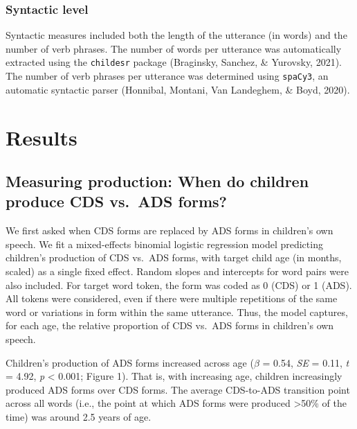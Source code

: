 \documentclass[10pt, letterpaper]{article}
\begin{document}
\hypertarget{syntactic-level}{%
\subsubsection{Syntactic level}\label{syntactic-level}}

Syntactic measures included both the length of the utterance (in words)
and the number of verb phrases. The number of words per utterance was
automatically extracted using the \texttt{childesr} package (Braginsky,
Sanchez, \& Yurovsky, 2021). The number of verb phrases per utterance
was determined using \texttt{spaCy3}, an automatic syntactic parser
(Honnibal, Montani, Van Landeghem, \& Boyd, 2020).

\hypertarget{results}{%
\section{Results}\label{results}}

\hypertarget{measuring-production-when-do-children-produce-cds-vs.-ads-forms}{%
\subsection{Measuring production: When do children produce CDS vs.~ADS
forms?}\label{measuring-production-when-do-children-produce-cds-vs.-ads-forms}}

We first asked when CDS forms are replaced by ADS forms in children's
own speech. We fit a mixed-effects binomial logistic regression model
predicting children's production of CDS vs.~ADS forms, with target child
age (in months, scaled) as a single fixed effect. Random slopes and
intercepts for word pairs were also included. For target word token, the
form was coded as 0 (CDS) or 1 (ADS). All tokens were considered, even
if there were multiple repetitions of the same word or variations in
form within the same utterance. Thus, the model captures, for each age,
the relative proportion of CDS vs.~ADS forms in children's own speech.

Children's production of ADS forms increased across age (\(\beta\) =
0.54, \emph{SE} = 0.11, \emph{t} = 4.92, \emph{p} \textless{} 0.001;
Figure 1). That is, with increasing age, children increasingly produced
ADS forms over CDS forms. The average CDS-to-ADS transition point across
all words (i.e., the point at which ADS forms were produced
\textgreater50\% of the time) was around 2.5 years of age.
\end{document}

